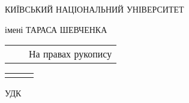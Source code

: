 \thispagestyle{empty}
\begin{center}%
\MakeUppercase{\thesisMON}

\vspace{0.5cm}
\MakeUppercase{Київський національний університет}

імені \MakeUppercase{Тараса Шевченка}

\end{center}%

\vspace{0pt plus1fill}
\noindent%
\begin{tabularx}{\textwidth}{@{}lXr@{}}%
    & & \large{На правах рукопису}\\
\end{tabularx}

\vspace{0pt plus1fill}
\noindent%
\begin{tabularx}{\textwidth}{@{}lXr@{}}%
    & & %
    \\
\end{tabularx}


\vspace{0pt plus-1fill} %
\begin{center}
\textbf {\MakeUppercase{ \thesisAuthor}}
\end{center}

\vspace{0pt plus1fill} %
\begin{flushright}%
  \begin{minipage}[b]{0.4\linewidth}
    \begin{flushleft}%
       УДК \thesisUdk
    \end{flushleft}%
  \end{minipage}
\end{flushright}%


